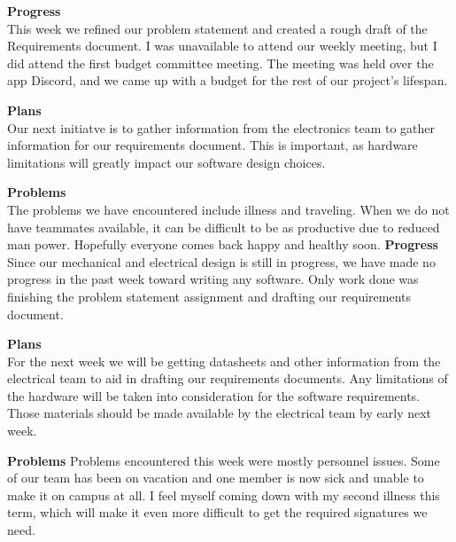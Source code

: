 \textbf{Progress} \\
This week we refined our problem statement and created a rough draft of the Requirements document. I was unavailable 
to attend our weekly meeting, but I did attend the first budget committee meeting. The meeting was held over the app 
Discord, and we came up with a budget for the rest of our project's lifespan.

\textbf{Plans} \\
Our next initiatve is to gather information from the electronics team to gather information for our requirements
document. This is important, as hardware limitations will greatly impact our software design choices.

\textbf{Problems} \\
The problems we have encountered include illness and traveling. When we do not have teammates available, it can be
difficult to be as productive due to reduced man power. Hopefully everyone comes back happy and healthy soon.
\textbf{Progress} \\
Since our mechanical and electrical design is still in progress, we have made no progress in the past week toward writing any software. Only work done was finishing the problem statement assignment and drafting our requirements document.

\textbf{Plans} \\
For the next week we will be getting datasheets and other information from the electrical team to aid in drafting our requirements documents. Any limitations of the hardware will be taken into consideration for the software requirements. Those materials should be made available by the electrical team by early next week.

\textbf{Problems}
Problems encountered this week were mostly personnel issues. Some of our team has been on vacation and one member is now sick and unable to make it on campus at all. I feel myself coming down with my second illness this term, which will make it even more difficult to get the required signatures we need.

